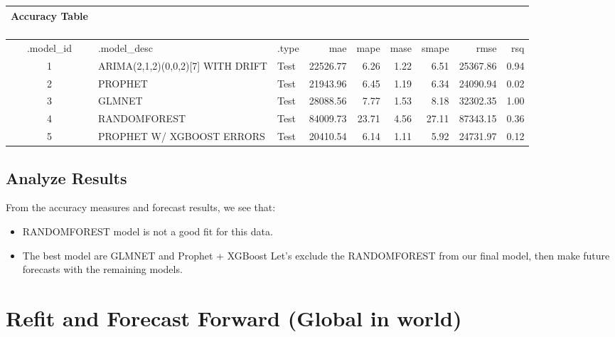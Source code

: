 \documentclass[
]{article}
\providecommand{\tightlist}{%
  \setlength{\itemsep}{0pt}\setlength{\parskip}{0pt}}
\begin{document}
\captionsetup[table]{labelformat=empty,skip=1pt}
\begin{longtable}{cllrrrrrr}
\caption*{
\large Accuracy Table\\ 
\small \\ 
} \\ 
\toprule
.model\_id & .model\_desc & .type & mae & mape & mase & smape & rmse & rsq \\ 
\midrule
1 & ARIMA(2,1,2)(0,0,2)[7] WITH DRIFT & Test & 22526.77 & 6.26 & 1.22 & 6.51 & 25367.86 & 0.94 \\ 
2 & PROPHET & Test & 21943.96 & 6.45 & 1.19 & 6.34 & 24090.94 & 0.02 \\ 
3 & GLMNET & Test & 28088.56 & 7.77 & 1.53 & 8.18 & 32302.35 & 1.00 \\ 
4 & RANDOMFOREST & Test & 84009.73 & 23.71 & 4.56 & 27.11 & 87343.15 & 0.36 \\ 
5 & PROPHET W/ XGBOOST ERRORS & Test & 20410.54 & 6.14 & 1.11 & 5.92 & 24731.97 & 0.12 \\ 
\bottomrule
\end{longtable}

\hypertarget{analyze-results}{%
\subsection{Analyze Results}\label{analyze-results}}

From the accuracy measures and forecast results, we see that:

\begin{itemize}
\tightlist
\item
  RANDOMFOREST model is not a good fit for this data.
\item
  The best model are GLMNET and Prophet + XGBoost Let's exclude the
  RANDOMFOREST from our final model, then make future forecasts with the
  remaining models.
\end{itemize}

\hypertarget{refit-and-forecast-forward-global-in-world}{%
\section{Refit and Forecast Forward (Global in
world)}\label{refit-and-forecast-forward-global-in-world}}
\end{document}
